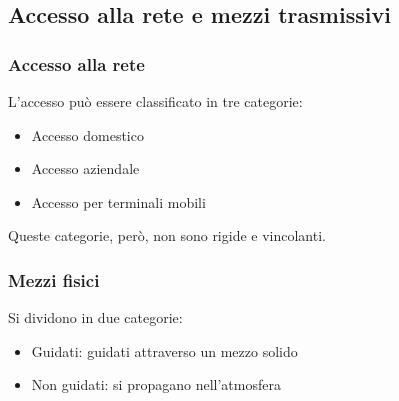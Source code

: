 \documentclass[11pt,a4paper]{article}
\begin{document}
\subsection{Accesso alla rete e mezzi trasmissivi}
\subsubsection{Accesso alla rete}
L’accesso può essere classificato in tre categorie:
\begin{itemize}
	\item Accesso domestico
	\item Accesso aziendale
	\item Accesso per terminali mobili
\end{itemize}
Queste categorie, però, non sono rigide e vincolanti.

\subsubsection{Mezzi fisici}
Si dividono in due categorie:
\begin{itemize}
	\item Guidati: guidati attraverso un mezzo solido
	\item Non guidati: si propagano nell’atmosfera
\end{itemize}
\end{document}
